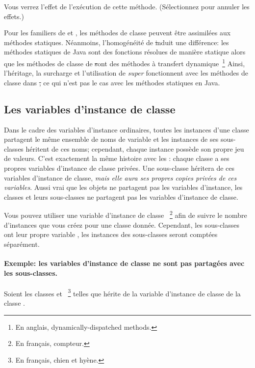 \documentclass[a4paper,10pt,twoside]{book}
\begin{document}
Vous verrez l'effet de l'ex\'ecution de cette m\'ethode.  (S\'electionnez  pour annuler les effets.)

Pour les familiers de  et ,  les m\'ethodes de classe peuvent \^etre assimil\'ees aux m\'ethodes statiques. 
N\'eanmoins, l'homog\'en\'eit\'e de \st induit une diff\'erence:  les m\'ethodes statiques de Java sont des fonctions r\'esolues de mani\`ere statique alors que les m\'ethodes de classe de \st sont des m\'ethodes \`a transfert dynamique~\footnote{En anglais, dynamically-dispatched methods.} Ainsi, l'h\'eritage, la surcharge et l'utilisation de \emph{super} fonctionnent avec les m\'ethodes de classe dans \st, ce qui n'est pas le cas avec les m\'ethodes statiques en Java.  

\subsection{Les variables d'instance de classe}
Dans le cadre des variables d'instance ordinaires,
toutes les instances d'une classe partagent le m\^eme ensemble
de noms de variable et les instances de ses sous-classes h\'eritent
de ces noms; cependant, chaque instance poss\`ede son propre jeu de valeurs.
C'est exactement la m\^eme histoire avec les : chaque classe a ses propres variables d'instance de classe priv\'ees.
Une sous-classe h\'eritera de ces  variables d'instance de classe, \emph{mais elle aura ses propres copies priv\'ees de ces variables}.
Aussi vrai que les objets ne partagent pas les variables d'instance, les classes et leurs sous-classes ne partagent pas les variables d'instance de classe.

Vous pouvez utiliser une variable d'instance de classe ~\footnote{En fran\c{c}ais, compteur.} afin de suivre le nombre d'instances que vous cr\'eez pour une classe donn\'ee.
Cependant, les sous-classes ont leur propre variable , 
les instances des sous-classes seront compt\'ees s\'epar\'ement.

\paragraph{Exemple: les variables d'instance de classe ne sont pas partag\'ees avec les sous-classes.}
Soient les classes  et ~\footnote{En fran\c{c}ais, chien et hy\`ene.} telles que  h\'erite de la variable d'instance de classe  de la classe .
\end{document}
